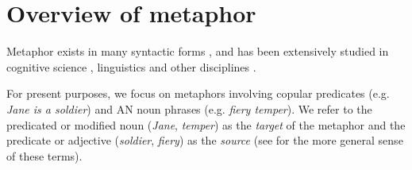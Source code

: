 \documentclass[9pt,twocolumn,twoside,lineno]{pnas-new}
\begin{document}









\section{Overview of metaphor}

	Metaphor exists in many syntactic forms \cite{black1954metaphor}, and has been extensively studied in cognitive science \cite{tourangeau1981aptness,roberts1994people,camp2006metaphor}, linguistics \cite{glucksberg1993metaphors,lakoff1993contemporary} and other disciplines \cite{martin1990computational,davidson}.

	For present purposes, we focus on metaphors involving copular predicates (e.g. \emph{Jane is a soldier}) and AN noun phrases (e.g. \emph{fiery temper}). We refer to the predicated or modified noun (\emph{Jane}, \emph{temper}) as the \emph{target} of the metaphor and the predicate or adjective (\emph{soldier}, \emph{fiery}) as the \emph{source} (see \cite{lakoff1980metaphors} for the more general sense of these terms).
\end{document}
